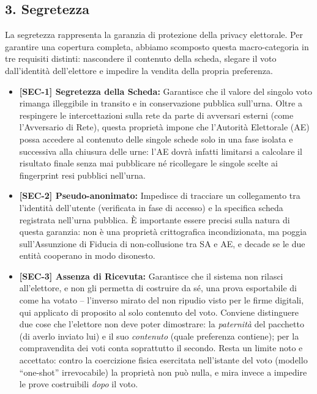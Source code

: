 \subsection*{3. Segretezza}
La segretezza rappresenta la garanzia di protezione della privacy elettorale. Per garantire una copertura completa, abbiamo scomposto questa macro-categoria in tre requisiti distinti: nascondere il contenuto della scheda, slegare il voto dall'identità dell'elettore e impedire la vendita della propria preferenza.

\begin{itemize}
    \item \textbf{[SEC-1] Segretezza della Scheda:} Garantisce che il valore del singolo voto rimanga illeggibile in transito e in conservazione pubblica sull'urna. Oltre a respingere le intercettazioni sulla rete da parte di avversari esterni (come l'Avversario di Rete), questa proprietà impone che l'Autorità Elettorale (AE) possa accedere al contenuto delle singole schede solo in una fase isolata e successiva alla chiusura delle urne: l'AE dovrà infatti limitarsi a calcolare il risultato finale senza mai pubblicare né ricollegare le singole scelte ai fingerprint resi pubblici nell'urna.
    \item \textbf{[SEC-2] Pseudo-anonimato:} Impedisce di tracciare un collegamento tra l'identità dell'utente (verificata in fase di accesso) e la specifica scheda registrata nell'urna pubblica. È importante essere precisi sulla natura di questa garanzia: non è una proprietà crittografica incondizionata, ma poggia sull'Assunzione di Fiducia di non-collusione tra SA e AE, e decade se le due entità cooperano in modo disonesto. 
    \item \textbf{[SEC-3] Assenza di Ricevuta:} Garantisce che il sistema non rilasci all'elettore, e non gli permetta di costruire da sé, una prova esportabile di come ha votato -- l'inverso mirato del non ripudio visto per le firme digitali, qui applicato di proposito al solo contenuto del voto. Conviene distinguere due cose che l'elettore non deve poter dimostrare: la \textit{paternità} del pacchetto (di averlo inviato lui) e il suo \textit{contenuto} (quale preferenza contiene); per la compravendita dei voti conta soprattutto il secondo. Resta un limite noto e accettato: contro la coercizione fisica esercitata nell'istante del voto (modello ``one-shot'' irrevocabile) la proprietà non può nulla, e mira invece a impedire le prove costruibili \textit{dopo} il voto.
\end{itemize}


